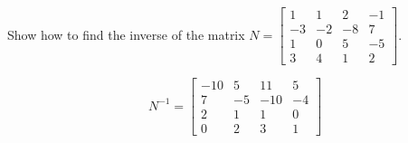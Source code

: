 
\begin{exerciseStatement}


Show how to find the inverse of the matrix \(N= \left[\begin{array}{cccc}
1 & 1 & 2 & -1 \\
-3 & -2 & -8 & 7 \\
1 & 0 & 5 & -5 \\
3 & 4 & 1 & 2
\end{array}\right] \).


\end{exerciseStatement}
    
\begin{exerciseAnswer} 
\[N^{-1}= \left[\begin{array}{cccc}
-10 & 5 & 11 & 5 \\
7 & -5 & -10 & -4 \\
2 & 1 & 1 & 0 \\
0 & 2 & 3 & 1
\end{array}\right] \]
\end{exerciseAnswer}
    
